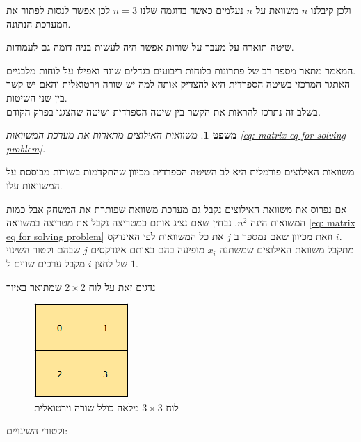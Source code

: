 \documentclass[12pt,twoside]{article}
\newtheorem{theorem}{משפט}[section]
\begin{document}
ולכן קיבלנו 
$n$
משוואת על 
$n$
נעלמים 
כאשר בדוגמה שלנו 
$n=3$
לכן אפשר לנסות לפתור את המערכת הנתונה.

שיטה תוארה על מעבר על שורות אפשר היה לעשות בניה דומה גם לעמודות.

המאמר 
\cite{B1}
מתאר מספר רב של פתרונות  בלוחות ריבועים בגדלים שונה ואפילו על לוחות מלבניים.
\\
האתגר המרכזי בשיטה הספרדית היא להצדיק אותה למה יש שורה וירטואלית
והאם יש קשר בין שני השיטות.
\\
בשלב זה נתרכז להראות את הקשר בין שיטה הספרדית ושיטה שהצגנו בפרק הקודם.

\begin{theorem}
    משוואות האילוצים מתארות את מערכת המשוואות 
    \ref{eq: matrix eq for solving problem}.
\end{theorem}
משוואות האילוצים פורמלית היא לב השיטה הספרדית
מכיוון שהתקדמות בשורות מבוססת על המשוואות עלו.

אם נפרוס את משוואת האילוצים נקבל גם מערכת משוואת שפותרת את המשחק
אבל כמות המשואות הינה 
$n^2$.
נבחין שאם נציג אותם כמטריצה נקבל את מטריצה במשוואה 
\ref{eq: matrix eq for solving problem}
וזאת מכיוון 
שאם נמספר ב
$j$
את כל המשוואות לפי 
האינדקס
$i$.
\\
מתקבל משוואת האילוצים שמשתנה 
$x_i$
מופיעה בהם
באותם אינדקסים 
$j$
שבהם 
וקטור השינוי של לחצן
$i$
מקבל ערכים 
שווים
ל
$1$.


נדגים זאת על לוח 
$2 \times 2$
שמתואר באיור 

\begin{figure}[ht]
    \caption{לוח 
    $3 \times 3$
    מלאה
    כולל שורה וירטואלית
    }
    \label{fig: 2 x 2 board}
    \unsethebrew
    \centering
    \includegraphics[width=.3\textwidth,height=.3\textheight,keepaspectratio]{images/2x2_board.PNG}
\end{figure}
\sethebrew

וקטורי השינויים:
\end{document}
